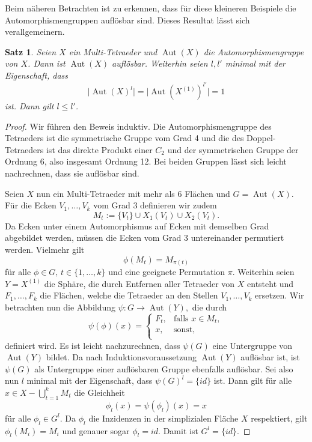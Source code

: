 \documentclass[12pt,titlepage,twoside,cleardoublepage]{article}
\theoremstyle{nummermitklammern}
\newtheorem{satz}[temp]{Satz}
\newtheorem{satz}[zahl]{Satz}
\numberwithin{equation}{section}
\DeclareMathOperator{\Aut}{Aut}
\begin{document}
Beim näheren Betrachten ist zu erkennen, dass für diese kleineren Beispiele die Automorphismengruppen auflösbar sind. Dieses Resultat lässt sich verallgemeinern. 
\begin{satz}\label{Maufl}
Seien $X$ ein Multi-Tetraeder und $\Aut(X)$ die Automorphismengruppe von $X$. Dann ist $\Aut(X)$ auflösbar.
Weiterhin seien $l,l'$ minimal mit der Eigenschaft, dass
\[
\vert \Aut(X)^l\vert=\vert \Aut(X^{(1)})^{l'}\vert =1
\] ist. Dann gilt $l\leq l'$.
\end{satz}
\begin{proof}
Wir führen den Beweis induktiv. Die Automorphismengruppe des Tetraeders ist die symmetrische Gruppe vom Grad 4 und die des Doppel-Tetraeders ist das direkte Produkt einer $C_2$ und der symmetrischen Gruppe der Ordnung 6, also insgesamt Ordnung 12. Bei beiden Gruppen lässt sich leicht nachrechnen, dass sie auflösbar sind.

Seien $X$ nun ein Multi-Tetraeder mit mehr als  6 Flächen und $G=\Aut(X)$. Für die Ecken $V_1,\ldots,V_k$ vom Grad $3$ definieren wir zudem 
\[
M_t:=\{V_t\} \cup X_1(V_t) \cup X_2(V_t).  
\] 
Da Ecken unter einem Automorphismus auf Ecken mit demselben Grad abgebildet werden, müssen die Ecken vom Grad 3 untereinander permutiert werden. Vielmehr gilt 
\[
\phi(M_t)=M_{\pi(t)} 
\]
für alle $\phi \in G,\,t\in \{1,\ldots,k\}$ und eine geeignete Permutation $\pi.$ Weiterhin seien $Y=X^{(1)}$ die Sphäre, die durch Entfernen aller Tetraeder von $X$ entsteht und $F_1,\ldots,F_k$ die Flächen, welche die Tetraeder an den Stellen $V_1,\ldots,V_k$ ersetzen. Wir betrachten nun die Abbildung $\psi:G\to \Aut(Y),$ die durch  
\[
\psi(\phi)(x)=
\begin{cases}
F_t,&\text{falls } x\in M_t, \\
x,& \text{sonst},\\
\end{cases}
\]
definiert wird. Es ist leicht nachzurechnen, dass $\psi(G)$ eine Untergruppe von $\Aut(Y)$ bildet. Da nach Induktionsvoraussetzung $\Aut(Y)$ auflösbar ist, ist $\psi(G)$ als Untergruppe einer auflösbaren Gruppe ebenfalls auflösbar. 
Sei also nun $l$ minimal mit der Eigenschaft, dass $\psi(G)^l=\{id\}$ ist. Dann gilt für alle $x\in X-\bigcup_{t=1}^k M_t$ die Gleichheit 
\[
\phi_l(x)=\psi(\phi_l)(x)=x
\] für alle $\phi_l \in G^l$. Da $\phi_l$ die Inzidenzen in der simplizialen Fläche $X$ respektiert, gilt $\phi_l(M_i)=M_i$ und genauer sogar $\phi_l=id.$ Damit ist $G^l =\{id\}$.
  
\end{proof}
\end{document}
